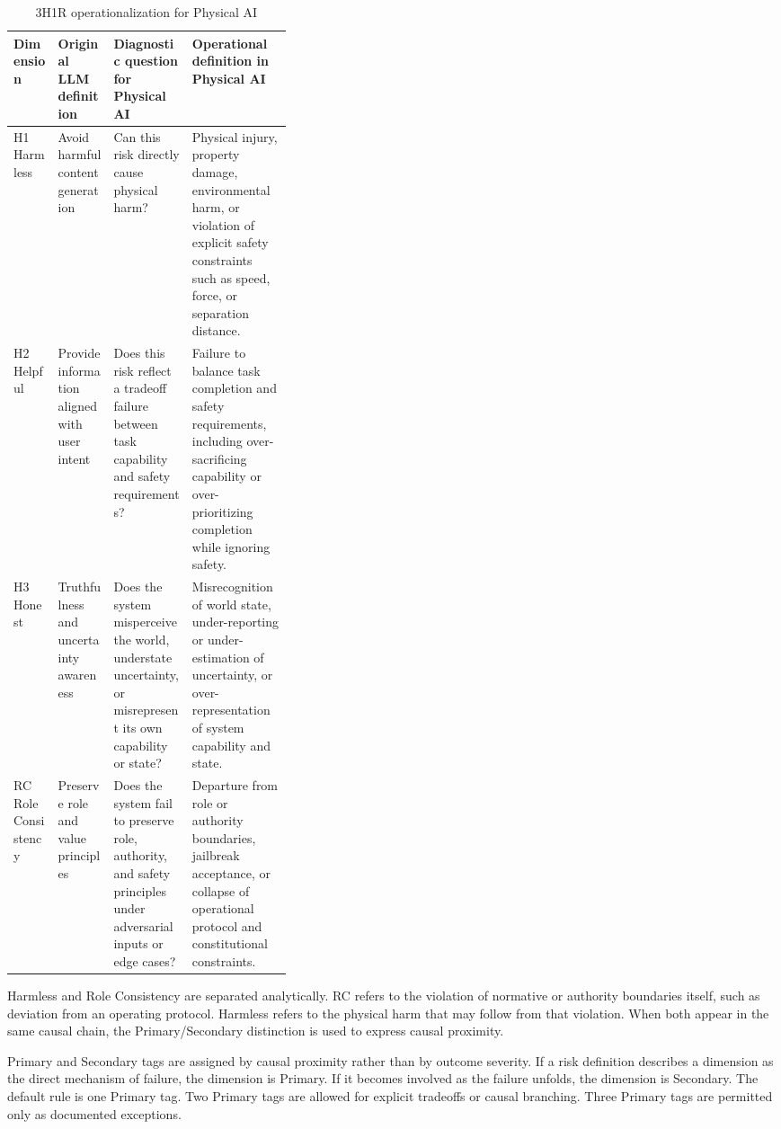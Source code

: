 \documentclass[11pt]{article}
\begin{document}
\begin{table}[htbp]
\centering
\footnotesize
\caption{3H1R operationalization for Physical AI}
\label{tab:three-h-one-r-operationalization}
\begin{tabularx}{\linewidth}{p{0.16\linewidth}p{0.20\linewidth}X X}
\toprule
Dimension & Original LLM definition & Diagnostic question for Physical AI & Operational definition in Physical AI \\
\midrule
H1 Harmless & Avoid harmful content generation & Can this risk directly cause physical harm? & Physical injury, property damage, environmental harm, or violation of explicit safety constraints such as speed, force, or separation distance. \\
H2 Helpful & Provide information aligned with user intent & Does this risk reflect a tradeoff failure between task capability and safety requirements? & Failure to balance task completion and safety requirements, including over-sacrificing capability or over-prioritizing completion while ignoring safety. \\
H3 Honest & Truthfulness and uncertainty awareness & Does the system misperceive the world, understate uncertainty, or misrepresent its own capability or state? & Misrecognition of world state, under-reporting or under-estimation of uncertainty, or over-representation of system capability and state. \\
RC Role Consistency & Preserve role and value principles & Does the system fail to preserve role, authority, and safety principles under adversarial inputs or edge cases? & Departure from role or authority boundaries, jailbreak acceptance, or collapse of operational protocol and constitutional constraints. \\
\bottomrule
\end{tabularx}
\end{table}

Harmless and Role Consistency are separated analytically. RC refers to the violation of normative or authority boundaries itself, such as deviation from an operating protocol. Harmless refers to the physical harm that may follow from that violation. When both appear in the same causal chain, the Primary/Secondary distinction is used to express causal proximity.

Primary and Secondary tags are assigned by causal proximity rather than by outcome severity. If a risk definition describes a dimension as the direct mechanism of failure, the dimension is Primary. If it becomes involved as the failure unfolds, the dimension is Secondary. The default rule is one Primary tag. Two Primary tags are allowed for explicit tradeoffs or causal branching. Three Primary tags are permitted only as documented exceptions.
\end{document}
